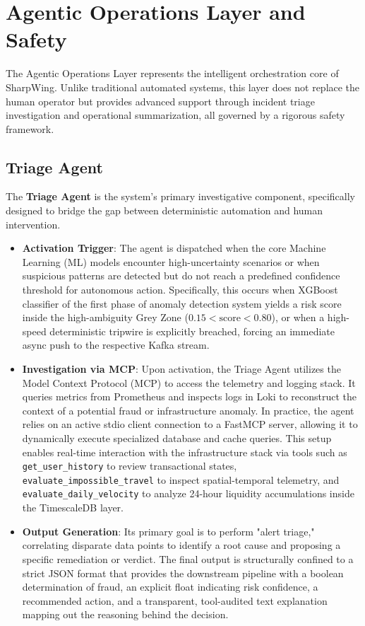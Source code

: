 \documentclass[12pt]{report}
\begin{document}
\chapter{Agentic Operations Layer and Safety}
\label{ch:agentic_layer}

The Agentic Operations Layer represents the intelligent orchestration core of SharpWing. Unlike traditional automated systems, this layer does not replace the human operator but provides advanced support through incident triage investigation and operational summarization, all governed by a rigorous safety framework.

\section{Triage Agent}
The \textbf{Triage Agent} is the system's primary investigative component, specifically designed to bridge the gap between deterministic automation and human intervention.
\begin{itemize}
    \item \textbf{Activation Trigger}: The agent is dispatched when the core Machine Learning (ML) models encounter high-uncertainty scenarios or when suspicious patterns are detected but do not reach a predefined confidence threshold for autonomous action. Specifically, this occurs when XGBoost classifier of the first phase of anomaly detection system yields a risk score inside the high-ambiguity Grey Zone ($0.15 < \text{score} < 0.80$), or when a high-speed deterministic tripwire is explicitly breached, forcing an immediate async push to the respective Kafka stream.
    \item \textbf{Investigation via MCP}: Upon activation, the Triage Agent utilizes the Model Context Protocol (MCP) to access the telemetry and logging stack. It queries metrics from Prometheus and inspects logs in Loki to reconstruct the context of a potential fraud or infrastructure anomaly. In practice, the agent relies on an active stdio client connection to a FastMCP server, allowing it to dynamically execute specialized database and cache queries. This setup enables real-time interaction with the infrastructure stack via tools such as \texttt{get\_user\_history} to review transactional states, \texttt{evaluate\_impossible\_travel} to inspect spatial-temporal telemetry, and \texttt{evaluate\_daily\_velocity} to analyze 24-hour liquidity accumulations inside the TimescaleDB layer.
    \item \textbf{Output Generation}: Its primary goal is to perform "alert triage," correlating disparate data points to identify a root cause and proposing a specific remediation or verdict. The final output is structurally confined to a strict JSON format that provides the downstream pipeline with a boolean determination of fraud, an explicit float indicating risk confidence, a recommended action, and a transparent, tool-audited text explanation mapping out the reasoning behind the decision.
\end{itemize}
\end{document}
